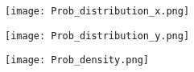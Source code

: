 \documentclass[journal,12pt,twocolumn]{IEEEtran}
\begin{document}
  \begin{figure}
    \centering
    \texttt{[image: Prob\_distribution\_x.png]}
    \caption{ }
    \label{Figure 1}
   \end{figure}

  \begin{figure}
    \centering
    \texttt{[image: Prob\_distribution\_y.png]}
    \caption{}
    \label{Figure 2}
  \end{figure}
  
  \begin{figure}
   \centering
    \texttt{[image: Prob\_density.png]}
   \caption{}
  \label{Figure 3}
  \end{figure}
\end{document}
